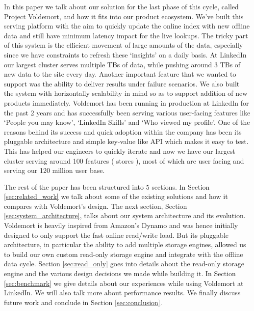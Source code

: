 \documentclass[10pt,twocolumn,preprint,natbib,authoryear]{sigplanconf}
\begin{document}
In this paper we talk about our solution for the last phase of this cycle, called Project Voldemort, and how it fits into our product ecosystem. We've built this serving platform with the aim to quickly update the online index with new offline data and still have minimum latency impact for the live lookups. The tricky part of this system is the efficient movement of large amounts of the data, especially since we have constraints to refresh these `insights' on a daily basis. At LinkedIn our largest cluster serves multiple TBs of data, while pushing around 3 TBs of new data to the site every day. Another important feature that we wanted to support was the ability to deliver results under failure scenarios. We also built the system with horizontally scalability in mind so as to support addition of new products immediately. Voldemort has been running in production at LinkedIn for the past 2 years and has successfully been serving various user-facing features like `People you may know', `LinkedIn Skills' and `Who viewed my profile'. One of the reasons behind its success and quick adoption within the company has been its pluggable architecture and simple key-value like API which makes it easy to test. This has helped our engineers to quickly iterate and now we have our largest cluster serving around 100 features ( stores ), most of which are user facing and serving our 120 million user base.

The rest of the paper has been structured into 5 sections. In Section \ref{sec:related_work} we talk about some of the existing solutions and how it compares with Voldemort's design. The next section, Section \ref{sec:system_architecture},  talks about our system architecture and its evolution. Voldemort is heavily inspired from Amazon's Dynamo\cite{5} and was hence initially designed to only support the fast online read/write load. But its pluggable architecture, in particular the ability to add multiple storage engines, allowed us to build our own custom read-only storage engine and integrate with the offline data cycle. Section \ref{sec:read_only} goes into details about the read-only storage engine and the various design decisions we made while building it. In Section \ref{sec:benchmark} we give details about our experiences while using Voldemort at LinkedIn. We will also talk more about performance results. We finally discuss future work and conclude in Section \ref{sec:conclusion}. 

\end{document}
